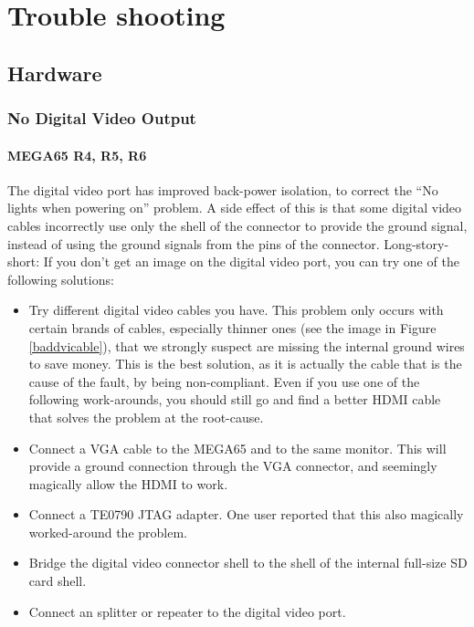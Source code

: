 \lstset{
    basicstyle=\small\ttfamily,
    columns=flexible,
    breaklines=true
}

\chapter{Trouble shooting}

\section{Hardware}
    \subsection{No Digital Video Output}
    
    \subsubsection{MEGA65 R4, R5, R6}
    The digital video port has improved back-power isolation, to correct the ``No lights when powering on'' problem.  A side effect of this is that some digital video cables incorrectly use only the shell of the connector to provide the ground signal, instead of using the ground signals from the pins of the connector.  Long-story-short: If you don't get an image on the digital video port, you can try one of the following solutions:
    \begin{itemize}
    \item Try different digital video cables you have.  This problem only occurs with certain brands of cables, especially thinner ones (see the image in Figure \ref{baddvicable}), that we strongly suspect are missing the internal ground wires to save money. This is the best solution, as it is actually the cable that is the cause of the fault, by being non-compliant. Even if you use one of the following work-arounds, you should still go and find a better HDMI cable that solves the problem at the root-cause.  
    \item Connect a VGA cable to the MEGA65 and to the same monitor. This will provide a ground connection through the VGA connector, and seemingly magically allow the HDMI to work.
    \item Connect a TE0790 JTAG adapter. One user reported that this also magically worked-around the problem.
    \item Bridge the digital video connector shell to the shell of the internal full-size SD card shell.
    \item Connect an splitter or repeater to the digital video port.
    \end{itemize}

